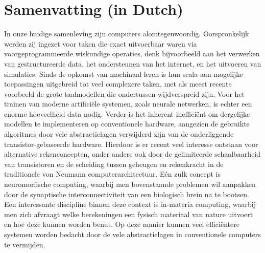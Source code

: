 \chapter*{Samenvatting (in Dutch)}\label{sec:Preface_NL}
In onze huidige samenleving zijn computers alomtegenwoordig.
Oorspronkelijk werden zij ingezet voor taken die exact uitvoerbaar waren via voorgeprogrammeerde wiskundige operaties, denk bijvoorbeeld aan het verwerken van gestructureerde data, het ondersteunen van het internet, en het uitvoeren van simulaties.
Sinds de opkomst van machinaal leren is hun scala aan mogelijke toepassingen uitgebreid tot veel complexere taken, met als meest recente voorbeeld de grote taalmodellen die ondertussen wijdverspreid zijn.
Voor het trainen van moderne artifici\"ele systemen, zoals neurale netwerken, is echter een enorme hoeveelheid data nodig.
Verder is het inherent ineffici\"ent om dergelijke modellen te implementeren op conventionele hardware, aangezien de gebruikte algoritmes door vele abstractielagen verwijderd zijn van de onderliggende transistor-gebaseerde hardware.
Hierdoor is er recent veel interesse ontstaan voor alternative rekenconcepten, onder andere ook door de gelimiteerde schaalbaarheid van transistoren en de scheiding tussen geheugen en rekenkracht in de traditionele von Neumann computerarchitectuur.
E\'en zulk concept is neuromorfische computing, waarbij men bovenstaande problemen wil aanpakken door de synaptische interconnectiviteit van een biologisch brein na te bootsen.
Een interessante discipline binnen deze context is in-materia computing, waarbij men zich afvraagt welke berekeningen een fysisch materiaal van nature uitvoert en hoe deze kunnen worden benut.
Op deze manier kunnen veel effici\"entere systemen worden bedacht door de vele abstractielagen in conventionele computers te vermijden. \\ %

